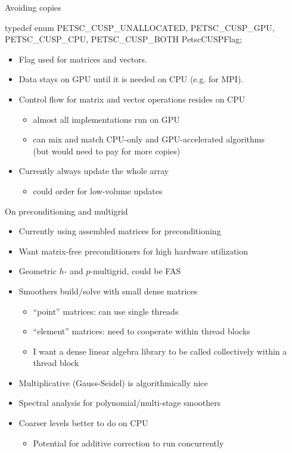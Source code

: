 \documentclass{beamer}
\begin{document}
\begin{frame}[fragile]{Avoiding copies}
  \begin{ccode}
    typedef enum {
      PETSC_CUSP_UNALLOCATED,
      PETSC_CUSP_GPU,
      PETSC_CUSP_CPU,
      PETSC_CUSP_BOTH
    } PetscCUSPFlag;
  \end{ccode}
  \begin{itemize}
  \item Flag used for matrices and vectors.
  \item Data stays on GPU until it is needed on CPU (e.g. for MPI).
  \item Control flow for matrix and vector operations resides on CPU
    \begin{itemize}
    \item almost all implementations run on GPU
    \item can mix and match CPU-only and GPU-accelerated algorithms \\
      (but would need to pay for more copies)
    \end{itemize}
  \item Currently always update the whole array
    \begin{itemize}
    \item could order for low-volume updates
    \end{itemize}
  \end{itemize}
\end{frame}




\begin{frame}{On preconditioning and multigrid}
  \begin{itemize}
  \item Currently using assembled matrices for preconditioning
  \item Want matrix-free preconditioners for high hardware utilization
  \item Geometric $h$- and $p$-multigrid, could be FAS
  \item Smoothers build/solve with small dense matrices
    \begin{itemize}
    \item ``point'' matrices: can use single threads
    \item ``element'' matrices: need to cooperate within thread blocks
    \item I want a dense linear algebra library to be called collectively within a thread block
    \end{itemize}
  \item Multiplicative (Gauss-Seidel) is algorithmically nice
  \item Spectral analysis for polynomial/multi-stage smoothers
  \item Coarser levels better to do on CPU
    \begin{itemize}
    \item Potential for additive correction to run concurrently
    \end{itemize}
  \end{itemize}
\end{frame}
\end{document}
